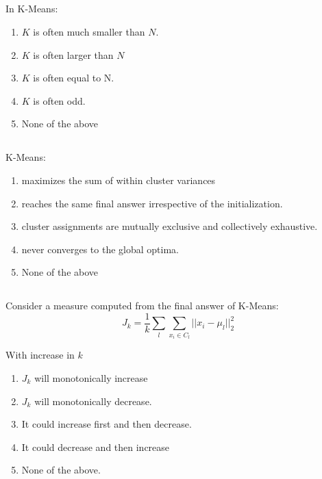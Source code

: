 \begin{frame}
\section{}
In K-Means:
\begin{enumerate}[label=(\Alph*)]
\item $K$ is often much smaller than $N$.   %
\item $K$ is often larger than $N$
\item $K$ is often equal to N.
\item $K$ is often odd.
\item None of the above  %
\end{enumerate}
\end{frame}

\begin{frame}
\section{}
K-Means:

\begin{enumerate}[label=(\Alph*)]
\item maximizes the sum of within cluster variances
\item reaches the same final answer irrespective of the initialization.
\item cluster assignments are mutually exclusive and collectively exhaustive.   %
\item never converges to the global optima.
\item None of the above   %
\end{enumerate}
\end{frame}

\begin{frame}
\section{}
Consider a measure computed from the final answer of K-Means:
\[ J_k = \frac{1}{k} \sum_{l} \sum_{x_i \in C_l} ||x_i - \mu_l||_2^2 \]

With increase in $k$

\begin{enumerate}[label=(\Alph*)]
\item $J_k$ will monotonically increase
\item $J_k$ will monotonically decrease.    %
\item It could increase first and then decrease.
\item It could decrease and then increase
\item None of the above.    %
\end{enumerate}
\end{frame}


